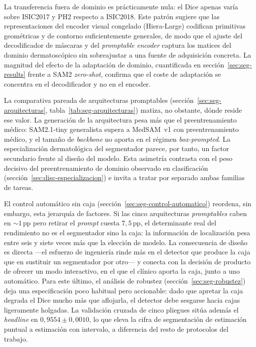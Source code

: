 La transferencia fuera de dominio es prácticamente nula: el Dice apenas
varía sobre ISIC2017 y PH2 respecto a ISIC2018. Este patrón sugiere que
las representaciones del encoder visual congelado (Hiera-Large) codifican
primitivas geométricas y de contorno suficientemente generales, de modo
que el ajuste del decodificador de máscaras y del \emph{promptable
encoder} captura los matices del dominio dermatoscópico sin sobreajustar a
una fuente de adquisición concreta. La magnitud del efecto de la
adaptación de dominio, cuantificada en sección~\ref{sec:seg-results}
frente a SAM2 \emph{zero-shot}, confirma que el coste de adaptación se
concentra en el decodificador y no en el encoder.

La comparativa pareada de arquitecturas promptables
(sección~\ref{sec:seg-arquitecturas},
tabla~\ref{tab:seg-arquitecturas}) matiza, no obstante, dónde reside
ese valor. La generación de la arquitectura pesa más que el
preentrenamiento médico: SAM2.1-tiny generalista supera a MedSAM~v1
con preentrenamiento médico, y el tamaño de \emph{backbone} no
aporta en el régimen \emph{box-prompted}. La especialización
dermatológica del segmentador parece, por tanto, un factor
secundario frente al diseño del modelo. Esta asimetría contrasta con
el peso decisivo del preentrenamiento de dominio observado en
clasificación (sección~\ref{sec:disc-especializacion}) e invita a
tratar por separado ambas familias de tareas.

El control automático sin caja
(sección~\ref{sec:seg-control-automatico}) reordena, sin embargo,
esta jerarquía de factores. Si las cinco arquitecturas
\emph{promptables} caben en $\sim 1$\,pp pero retirar el \emph{prompt}
cuesta $7{,}5$\,pp, el determinante real del rendimiento no es el
segmentador sino la caja: la información de localización pesa entre
seis y siete veces más que la elección de modelo. La consecuencia de
diseño es directa ---el esfuerzo de ingeniería rinde más en el
detector que produce la caja que en sustituir un segmentador por
otro--- y conecta con la decisión de producto de ofrecer un modo
interactivo, en el que el clínico aporta la caja, junto a uno
automático. Para este último, el análisis de robustez
(sección~\ref{sec:seg-robustez}) deja una especificación poco
habitual pero accionable: dado que apretar la caja degrada el Dice
mucho más que aflojarla, el detector debe sesgarse hacia cajas
ligeramente holgadas. La validación cruzada de cinco pliegues sitúa
además el \emph{headline} en $0{,}9554\pm 0{,}0010$, lo que eleva la
cifra de segmentación de estimación puntual a estimación con
intervalo, a diferencia del resto de protocolos del trabajo.

